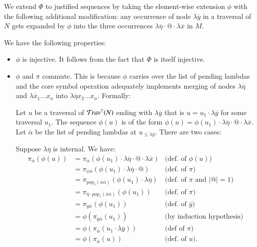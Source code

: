 \documentclass{elsarticle}
\theoremstyle{plain}
\theoremstyle{definition}
\theoremstyle{remark}
\def\coresymbol{\pi} %
\begin{document}
\begin{description}
    We extend $\Phi$ to justified sequences by taking the element-wise extension $\phi$ with the following additional modification: any occurrence of node $\lambda\overline{y}$ in a traversal of $N$ gets expanded by $\phi$ into the three occurrences $\lambda\overline\eta \cdot @ \cdot \lambda\overline{x}$ in $M$.

    We have the following properties:
    \begin{itemize}
    \item $\phi$ is injective. It follows from the fact that $\Phi$ is itself injective.

    \item $\phi$ and $\coresymbol$ commute. This is because $\phi$ carries over the list of pending lambdas and the core symbol operation adequately implements merging of nodes $\lambda\overline\eta$ and
    $\lambda\overline x_1 \ldots x_n$ into
    $\lambda\overline\eta x_2 \ldots x_n$. Formally:

    Let $u$ be a traversal of $\mathcal{T}\!rav^\dagger(N)$
    ending with $\lambda\overline{y}$ that is
    $u = u_1 \cdot \lambda\overline{y} $ for some traversal $u_1$.
    The sequence $\phi(u)$ is of the form
    $\phi(u) = \phi(u_1) \cdot \lambda\overline{\eta} \cdot @ \cdot \lambda\overline{x}$. Let $\overline\alpha$ be the list of pending lambdas at $u_{\leq \lambda\overline{y}}$. There are two cases:

    Suppose $\lambda\overline\eta$ is internal. We have:
    \begin{align*}
        \coresymbol_{\overline\alpha}(\phi(u))
        &=  \coresymbol_{\overline\alpha}(\phi(u_1) \cdot \lambda\overline{\eta} \cdot @ \cdot \lambda\overline{x})
            & \mbox{(def.~of $\phi(u)$)}
        \\
        &=  \coresymbol_{\overline{x}\overline\alpha}(\phi(u_1) \cdot
        \lambda\overline\eta \cdot @)
            & \mbox{(def.~of $\coresymbol$)}
        \\
        &=  \coresymbol_{pop_1(\overline{x}\overline\alpha)}(\phi(u_1) \cdot
        \lambda\overline{\eta})
            & \mbox{(def.~of $\coresymbol$ and $|@|=1$)}
        \\
        &=  \coresymbol_{\overline\eta \cdot pop_1(\overline{x}\overline\alpha)}(\phi(u_1))
            & \mbox{(def.~of $\coresymbol$)}
        \\
        &=  \coresymbol_{\overline{y}\overline\alpha}(\phi(u_1))
            & \mbox{(def.~of $\overline{y}$)}
        \\
        &=  \phi(\coresymbol_{\overline{y}\overline\alpha}(u_1))
            & \mbox{(by induction hypothesis)}
        \\
        &= \phi(\coresymbol_{\overline\alpha}(u_1 \cdot \lambda\overline{y})) & \mbox{(def of $\coresymbol$)} \\
        &=  \phi(\coresymbol_{\overline\alpha}(u))
            & \mbox{(def.~of $u$).}
    \end{align*}


\end{itemize}
\end{description}
\end{document}
